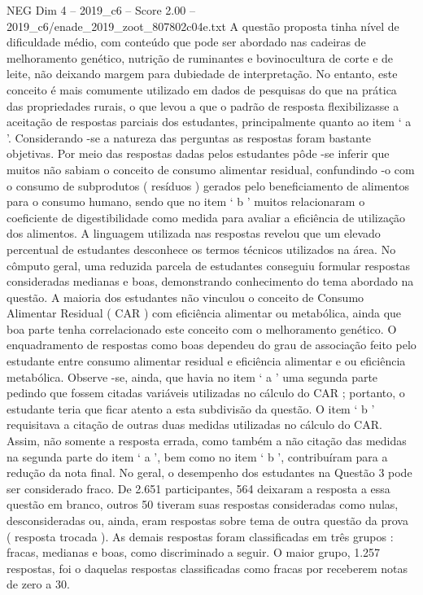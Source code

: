\begin{textsample}{NEG Dim 4 – 2019\_c6 – Score 2.00 – 2019\_c6/enade\_2019\_zoot\_807802c04e.txt}
A questão proposta tinha nível de dificuldade médio, com conteúdo que pode ser abordado nas cadeiras de melhoramento genético, nutrição de ruminantes e bovinocultura de corte e de leite, não deixando margem para dubiedade de interpretação.
No entanto, este conceito é mais comumente utilizado em dados de pesquisas do que na prática das propriedades rurais, o que levou a que o padrão de resposta flexibilizasse a aceitação de respostas parciais dos estudantes, principalmente quanto ao item ‘ a ’.
Considerando -se a natureza das perguntas as respostas foram bastante objetivas.
Por meio das respostas dadas pelos estudantes pôde -se inferir que muitos não sabiam o conceito de consumo alimentar residual, confundindo -o com o consumo de subprodutos ( resíduos ) gerados pelo beneficiamento de alimentos para o consumo humano, sendo que no item ‘ b ’ muitos relacionaram o coeficiente de digestibilidade como medida para avaliar a eficiência de utilização dos alimentos.
A linguagem utilizada nas respostas revelou que um elevado percentual de estudantes desconhece os termos técnicos utilizados na área.
No cômputo geral, uma reduzida parcela de estudantes conseguiu formular respostas consideradas medianas e boas, demonstrando conhecimento do tema abordado na questão.
A maioria dos estudantes não vinculou o conceito de Consumo Alimentar Residual ( CAR ) com eficiência alimentar ou metabólica, ainda que boa parte tenha correlacionado este conceito com o melhoramento genético.
O enquadramento de respostas como boas dependeu do grau de associação feito pelo estudante entre consumo alimentar residual e eficiência alimentar e ou eficiência metabólica.
Observe -se, ainda, que havia no item ‘ a ’ uma segunda parte pedindo que fossem citadas variáveis utilizadas no cálculo do CAR ; portanto, o estudante teria que ficar atento a esta subdivisão da questão.
O item ‘ b ’ requisitava a citação de outras duas medidas utilizadas no cálculo do CAR.
Assim, não somente a resposta errada, como também a não citação das medidas na segunda parte do item ‘ a ’, bem como no item ‘ b ’, contribuíram para a redução da nota final.
No geral, o desempenho dos estudantes na Questão 3 pode ser considerado fraco.
De 2.651 participantes, 564 deixaram a resposta a essa questão em branco, outros 50 tiveram suas respostas consideradas como nulas, desconsideradas ou, ainda, eram respostas sobre tema de outra questão da prova ( resposta trocada ).
As demais respostas foram classificadas em três grupos : fracas, medianas e boas, como discriminado a seguir.
O maior grupo, 1.257 respostas, foi o daquelas respostas classificadas como fracas por receberem notas de zero a 30.

\end{textsample}
